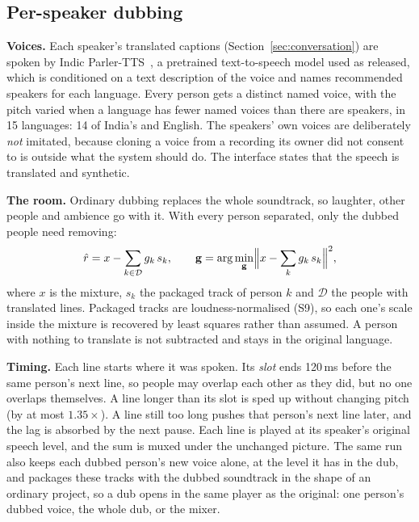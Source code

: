\subsection{Per-speaker dubbing}
\textbf{Voices.} Each speaker's translated captions (Section~\ref{sec:conversation}) are spoken by Indic Parler-TTS~\cite{sankar2025rasmalai,lyth2024natural}, a pretrained text-to-speech model used as released, which is conditioned on a text description of the voice and names recommended speakers for each language. Every person gets a distinct named voice, with the pitch varied when a language has fewer named voices than there are speakers, in 15 languages: 14 of India's and English. The speakers' own voices are deliberately \emph{not} imitated, because cloning a voice from a recording its owner did not consent to is outside what the system should do. The interface states that the speech is translated and synthetic.

\textbf{The room.} Ordinary dubbing replaces the whole soundtrack, so laughter, other people and ambience go with it. With every person separated, only the dubbed people need removing:
\begin{equation}
\hat{r} = x - \sum_{k\in\mathcal{D}} g_k\, s_k ,\qquad
\mathbf{g} = \arg\min_{\mathbf{g}} \Bigl\lVert x - \sum_{k} g_k\, s_k \Bigr\rVert^2 ,
\label{eq:room}
\end{equation}
where $x$ is the mixture, $s_k$ the packaged track of person $k$ and $\mathcal{D}$ the people with translated lines. Packaged tracks are loudness-normalised (S9), so each one's scale inside the mixture is recovered by least squares rather than assumed. A person with nothing to translate is not subtracted and stays in the original language.

\textbf{Timing.} Each line starts where it was spoken. Its \emph{slot} ends 120\,ms before the same person's next line, so people may overlap each other as they did, but no one overlaps themselves. A line longer than its slot is sped up without changing pitch (by at most $1.35\times$). A line still too long pushes that person's next line later, and the lag is absorbed by the next pause. Each line is played at its speaker's original speech level, and the sum is muxed under the unchanged picture. The same run also keeps each dubbed person's new voice alone, at the level it has in the dub, and packages these tracks with the dubbed soundtrack in the shape of an ordinary project, so a dub opens in the same player as the original: one person's dubbed voice, the whole dub, or the mixer.

